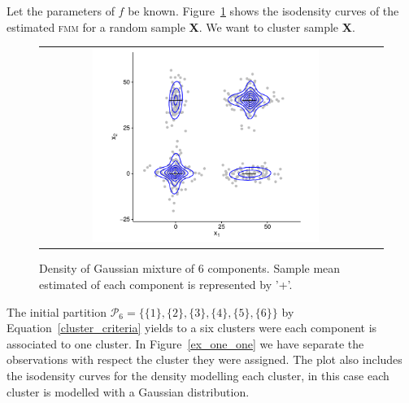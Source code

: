 \documentclass[submit]{smj}
\theoremstyle{definition}
\newcommand{\fmm}{\textsc{fmm}\xspace}
\begin{document}
Let the parameters of $f$ be known. Figure~\ref{ex_mixture} shows the isodensity curves of the estimated \fmm for 
a random sample \textbf{X}. We want to cluster sample \textbf{X}.

\begin{figure}[htbp]
\begin{center}
\begin{tabular}{cc}
  \includegraphics[width=0.7\textwidth]{figures/partition-example-mixture.pdf} \\
 \end{tabular}
 \caption{Density of Gaussian mixture of 6 components. Sample mean estimated of each component is represented by '+'.}\label{ex_mixture}
\end{center}
\end{figure}

The initial partition  $\mathcal{P}_6 = \{ \{1\},\{2\}, \{3\}, \{4\}, \{5\}, \{6\} \}$  by Equation~\ref{cluster_criteria} yields to a six clusters were each component is associated to one cluster. In Figure~\ref{ex_one_one} we have separate the observations with respect the cluster they were assigned. The plot also includes the isodensity curves for the density modelling each cluster, in this case each cluster is modelled with a Gaussian distribution.
\end{document}
